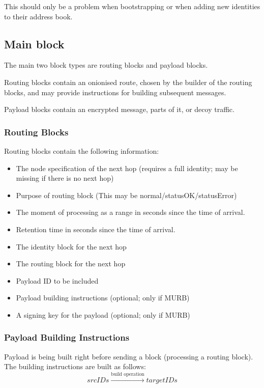 This should only be a problem when bootstrapping or when adding new identities to their address book. 

\subsection{Main block}
The main two block types are routing blocks and payload blocks. 

Routing blocks contain an onionised route, chosen by the builder of the routing blocks, and may provide instructions for building subsequent messages.

Payload blocks contain an encrypted message, parts of it, or decoy traffic.

\subsubsection{Routing Blocks}
Routing blocks contain the following information:
\begin{itemize}
	\item The node specification of the next hop (requires a full identity; may be missing  if there is no next hop)
	\item Purpose of routing block (This may be normal/statusOK/statusError)
	\item The moment of processing as a range in seconds since the time of arrival.
	\item Retention time in seconds since the time of arrival.
	\item The identity block for the next hop
	\item The routing block for the next hop
	\item Payload ID to be included
	\item Payload building instructions (optional; only if MURB)
	\item A signing key for the payload (optional; only if MURB)
\end{itemize}

\subsubsection{Payload Building Instructions\label{sec:buildInstr}}
Payload is being built right before sending a block (processing a routing block). The building instructions are built as follows:
\begin{equation*}
srcIDs \xrightarrow{\text{build operation}} targetIDs
\end{equation*}

